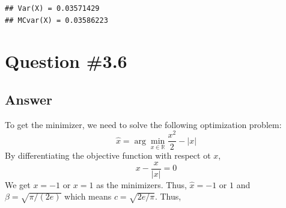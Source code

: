 \documentclass[11pt,]{article}
\begin{document}
\begin{verbatim}
## Var(X) = 0.03571429
## MCvar(X) = 0.03586223
\end{verbatim}

\section{Question \#3.6}\label{question-3.6}

\subsection{Answer}\label{answer-4}

To get the minimizer, we need to solve the following optimization
problem: \[
\hat{x} = \arg\min_{x\in \mathbb{R}} \dfrac{x^{2}}{2}-|x|
\] By differentiating the objective function with respect ot \(x\), \[
x - \dfrac{x}{|x|} = 0
\] We get \(x = -1\) or \(x = 1\) as the minimizers. Thus,
\(\hat{x} = -1\) or \(1\) and \(\beta = \sqrt{\pi / (2e)}\) which means
\(c = \sqrt{2e / \pi}\). Thus,
\end{document}
